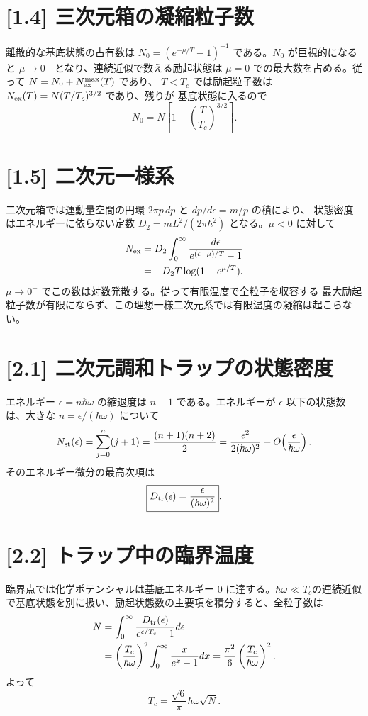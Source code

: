 \documentclass[11pt,a4paper]{article}
\begin{document}
\section*{[1.4] 三次元箱の凝縮粒子数}
離散的な基底状態の占有数は $N_0=(e^{-\mu/T}-1)^{-1}$ である。$N_0$ が巨視的になると $\mu\to0^-$ となり、連続近似で数える励起状態は $\mu=0$ での最大数を占める。従って $N=N_0+N_{\rm ex}^{\max}(T)$ であり、
$T<T_c$ では励起粒子数は $N_{\rm ex}(T)=N(T/T_c)^{3/2}$ であり、残りが
基底状態に入るので
\begin{equation}
 \boxed{N_0=N\left[1-\left(\frac{T}{T_c}\right)^{3/2}\right]}.
\end{equation}

\section*{[1.5] 二次元一様系}
二次元箱では運動量空間の円環 $2\pi p\,dp$ と $dp/d\epsilon=m/p$ の積により、
状態密度はエネルギーに依らない定数
$D_2=mL^2/(2\pi\hbar^2)$ となる。$\mu<0$ に対して
\begin{align}
 N_{\rm ex}
 &=D_2\int_0^\infty\frac{d\epsilon}
                 {e^{(\epsilon-\mu)/T}-1}\\
 &=-D_2T\log(1-e^{\mu/T}).
\end{align}
$\mu\to0^-$ でこの数は対数発散する。従って有限温度で全粒子を収容する
最大励起粒子数が有限にならず、この理想一様二次元系では有限温度の凝縮は起こらない。

\section*{[2.1] 二次元調和トラップの状態密度}
エネルギー $\epsilon=n\hbar\omega$ の縮退度は $n+1$ である。エネルギーが
$\epsilon$ 以下の状態数は、大きな $n=\epsilon/(\hbar\omega)$ について
\begin{equation}
 N_{\rm st}(\epsilon)=\sum_{j=0}^{n}(j+1)
 =\frac{(n+1)(n+2)}2
 =\frac{\epsilon^2}{2(\hbar\omega)^2}
   +O\!\left(\frac{\epsilon}{\hbar\omega}\right).
\end{equation}
そのエネルギー微分の最高次項は
\begin{equation}
 \boxed{D_{\rm tr}(\epsilon)=\frac{\epsilon}{(\hbar\omega)^2}}.
\end{equation}

\section*{[2.2] トラップ中の臨界温度}
臨界点では化学ポテンシャルは基底エネルギー $0$ に達する。$\hbar\omega\ll T_c$の連続近似で基底状態を別に扱い、励起状態数の主要項を積分すると、全粒子数は
\begin{align}
 N&=\int_0^\infty\frac{D_{\rm tr}(\epsilon)}{e^{\epsilon/T_c}-1}d\epsilon\\
 &=\left(\frac{T_c}{\hbar\omega}\right)^2
   \int_0^\infty\frac{x}{e^x-1}dx
 =\frac{\pi^2}{6}\left(\frac{T_c}{\hbar\omega}\right)^2.
\end{align}
よって
\begin{equation}
 \boxed{T_c=\frac{\sqrt6}{\pi}\hbar\omega\sqrt N}.
\end{equation}
\end{document}
